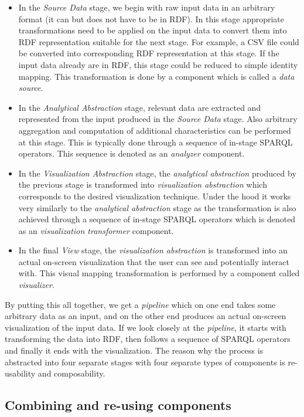 \begin{itemize}
\item In the \emph{Source Data} stage, we begin with raw input data in an arbitrary format (it can but does not have to be in RDF). In this stage appropriate transformations need to be applied on the input data to convert them into RDF representation suitable for the next stage. For example, a CSV file could be converted into corresponding RDF representation at this stage. If the input data already are in RDF, this stage could be reduced to simple identity mapping. This transformation is done by a component which is called a \emph{data source}.
\item In the \emph{Analytical Abstraction} stage, relevant data are extracted and represented from the input produced in the \emph{Source Data} stage. Also arbitrary aggregation and computation of additional characteristics can be performed at this stage. This is typically done through a sequence of in-stage SPARQL operators. This sequence is denoted as an \emph{analyzer} component.
\item In the \emph{Visualization Abstraction} stage, the \emph{analytical abstraction} produced by the previous stage is transformed into \emph{visualization abstraction} which corresponds to the desired visualization technique. Under the hood it works very similarly to the \emph{analytical abstraction} stage as the transformation is also achieved through a sequence of in-stage SPARQL operators which is denoted as an \emph{visualization transformer} component.
\item In the final \emph{View} stage, the \emph{visualization abstraction} is transformed into an actual on-screen visualization that the user can see and potentially interact with. This visual mapping transformation is performed by a component called \emph{visualizer}.
\end{itemize}

By putting this all together, we get a \emph{pipeline} which on one end takes some arbitrary data as an input, and on the other end produces an actual on-screen visualization of the input data. If we look closely at the \emph{pipeline}, it starts with transforming the data into RDF, then follows a sequence of SPARQL operators and finally it ends with the visualization. The reason why the process is abstracted into four separate stages with four separate types of components is re-usability and composability. 

\subsection{Combining and re-using components}

